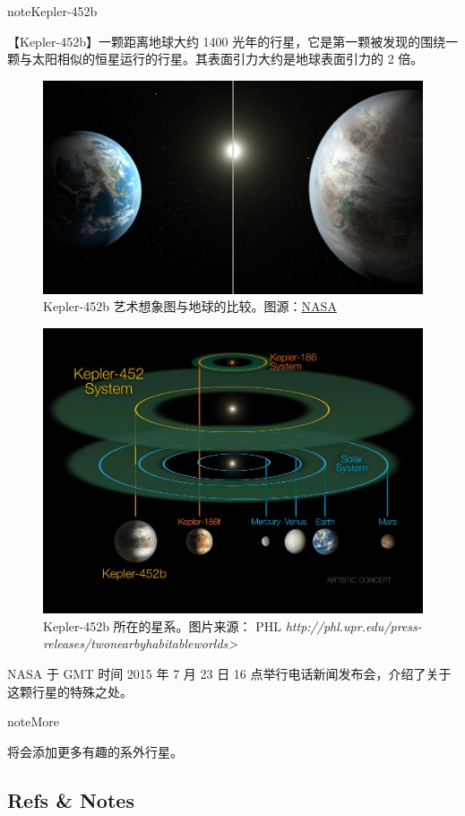 \documentclass[letterpaper,10pt,english]{sphinxmanual}
\begin{document}
\begin{notice}{note}{Kepler-452b}

【Kepler-452b】一颗距离地球大约 1400 光年的行星，它是第一颗被发现的围绕一颗与太阳相似的恒星运行的行星。其表面引力大约是地球表面引力的 2 倍。
\begin{figure}[htbp]
\centering
\capstart

\includegraphics{452b_artistconcept_comparisonwithearth.jpg}
\caption{Kepler-452b 艺术想象图与地球的比较。图源：\href{http://www.nasa.gov/press-release/nasa-kepler-mission-discovers-bigger-older-cousin-to-earth}{NASA}}\end{figure}
\begin{figure}[htbp]
\centering
\capstart

\includegraphics{kepler-452b-sys.jpg}
\caption{Kepler-452b 所在的星系。图片来源： PHL \emph{http://phl.upr.edu/press-releases/twonearbyhabitableworlds\textgreater{}}}\end{figure}

NASA 于 GMT 时间 2015 年 7 月 23 日 16 点举行电话新闻发布会，介绍了关于这颗行星的特殊之处。
\end{notice}

\begin{notice}{note}{More}

将会添加更多有趣的系外行星。
\end{notice}


\subsection{Refs \& Notes}
\label{exoint:refs-notes}


\renewcommand{\indexname}{Index}
\printindex
\end{document}
